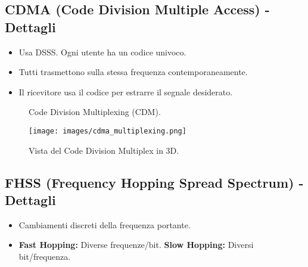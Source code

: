 \subsection{CDMA (Code Division Multiple Access) - Dettagli}
\begin{itemize}
    \item Usa DSSS. Ogni utente ha un codice univoco.
    \item Tutti trasmettono sulla stessa frequenza contemporaneamente.
    \item Il ricevitore usa il codice per estrarre il segnale desiderato.
\end{itemize}

\begin{figure}[H]
    \centering
    \caption{Code Division Multiplexing (CDM).}
    \label{fig:cdm}
\end{figure}
\begin{figure}[H]
    \centering
    \texttt{[image: images/cdma\_multiplexing.png]}
    \caption{Vista del Code Division Multiplex in 3D.}
    \label{fig:cdm_3d}
\end{figure}

\subsection{FHSS (Frequency Hopping Spread Spectrum) - Dettagli}
\begin{itemize}
    \item Cambiamenti discreti della frequenza portante.
    \item \textbf{Fast Hopping:} Diverse frequenze/bit. \textbf{Slow Hopping:} Diversi bit/frequenza.
\end{itemize}

